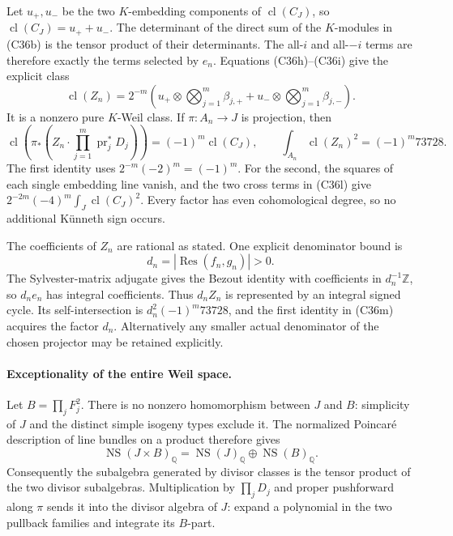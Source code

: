 \documentclass[11pt]{article}
\newcommand{\Q}{\mathbb Q}\newcommand{\C}{\mathbb C}\newcommand{\Z}{\mathbb Z}\newcommand{\R}{\mathbb R}\newcommand{\A}{\mathbb A}\newcommand{\OO}{\mathcal O}
\theoremstyle{definition}\newtheorem{definition}[theorem]{Definition}\newtheorem{remark}[theorem]{Remark}
\begin{document}
Let $u_+,u_-$ be the two $K$-embedding components of
$\operatorname{cl}(C_J)$, so
$\operatorname{cl}(C_J)=u_++u_-$.
The determinant of the direct sum of the $K$-modules
in (C36b) is the tensor product of their determinants.
The all-$i$ and all-$-i$ terms are therefore exactly
the terms selected by $e_n$. Equations (C36h)--(C36i)
give the explicit class
\[
 \operatorname{cl}(Z_n)=2^{-m}
 \left(u_+\otimes\bigotimes_{j=1}^m\beta_{j,+}
       +u_-\otimes\bigotimes_{j=1}^m\beta_{j,-}\right).
 \tag{C36l}
\]
It is a nonzero pure $K$-Weil class. If
$\pi:A_n\to J$ is projection, then
\[
 \operatorname{cl}\left(
   \pi_*\left(Z_n\cdot\prod_{j=1}^m
                         \operatorname{pr}_j^*D_j\right)\right)
          =(-1)^m\operatorname{cl}(C_J),
 \qquad
 \int_{A_n}\operatorname{cl}(Z_n)^2
          =(-1)^m73728.
 \tag{C36m}
\]
The first identity uses $2^{-m}(-2)^m=(-1)^m$.
For the second, the squares of each single embedding
line vanish, and the two cross terms in (C36l) give
$2^{-2m}(-4)^m\int_J\operatorname{cl}(C_J)^2$.
Every factor has even cohomological degree, so no
additional K\"unneth sign occurs.

The coefficients of $Z_n$ are rational as stated.
One explicit denominator bound is
\[
                 d_n=|\operatorname{Res}(f_n,g_n)|>0.
\]
The Sylvester-matrix adjugate gives the Bezout identity
with coefficients in $d_n^{-1}\Z$, so $d_ne_n$ has
integral coefficients. Thus $d_nZ_n$ is represented
by an integral signed cycle. Its self-intersection
is $d_n^2(-1)^m73728$, and the first identity in
(C36m) acquires the factor $d_n$. Alternatively any
smaller actual denominator of the chosen projector
may be retained explicitly.

\paragraph{Exceptionality of the entire Weil space.}
Let $B=\prod_jF_j^2$. There is no nonzero homomorphism
between $J$ and $B$: simplicity of $J$ and the distinct
simple isogeny types exclude it. The normalized
Poincar\'e description of line bundles on a product
therefore gives
\[
             \operatorname{NS}(J\times B)_\Q
              =\operatorname{NS}(J)_\Q
                         \oplus\operatorname{NS}(B)_\Q.
 \tag{C36n}
\]
Consequently the subalgebra generated by divisor classes
is the tensor product of the two divisor subalgebras.
Multiplication by $\prod_jD_j$ and proper pushforward
along $\pi$ sends it into the divisor algebra of $J$:
expand a polynomial in the two pullback families and
integrate its $B$-part.
\end{document}
